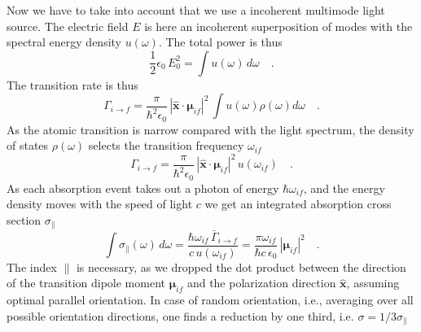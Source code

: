Now we have to take into account that we use a incoherent multimode light source. The electric field $E$ is here an incoherent superposition of  modes with the  spectral energy density $u(\omega)$.
The total power is thus
\begin{equation}
 \frac{1}{2} \epsilon_0  \, E_0^2  = \int  u(\omega)  \, d\omega \quad .
\end{equation}
The  transition rate is thus 
\begin{equation}
 \Gamma_{i \rightarrow f} =   \frac{\pi  }{\hbar^2 \epsilon_0}  \, |\mathbf{\hat{x}} \cdot \mathbf{\mu}_{if} |^2 \,
\int u(\omega)  
  \rho(\omega)  d \omega \quad .
\end{equation}
As the atomic transition is narrow compared with the light spectrum, the density of states $\rho(\omega)$ selects the transition frequency $\omega_{if}$ 
\begin{equation}
 \Gamma_{i \rightarrow f} =   \frac{\pi  }{\hbar^2 \epsilon_0}  \, |\mathbf{\hat{x}} \cdot \mathbf{\mu}_{if} |^2 \,
 u(\omega_{if})   \quad .
\end{equation}
As each absorption event takes out a photon of energy $\hbar \omega_{if}$, and the energy density moves with the speed of light $c$ we get an integrated absorption cross section $\sigma_{\parallel}$ 
\begin{equation}
 \int \sigma_{\parallel}(\omega) \, d \omega = \frac{ \hbar \omega_{if} \, \bar{\Gamma}_{i \rightarrow f} }{c \, u(\omega_{if})}  = 
  \frac{\pi \omega_{if}}{ \hbar c \, \epsilon_0} \,
 |\mathbf{\mu}_{if} |^2  \quad .
\end{equation}
The index ${\parallel} $ is necessary, as we dropped the dot product between the direction of the transition dipole moment $\mathbf{\mu}_{if}$ and the polarization direction $\mathbf{\hat{x}}$, assuming optimal parallel orientation. In case of random orientation, i.e., averaging over all possible orientation directions, one finds  a reduction by one third, i.e. $\sigma = 1/3 \sigma_{\parallel} $

